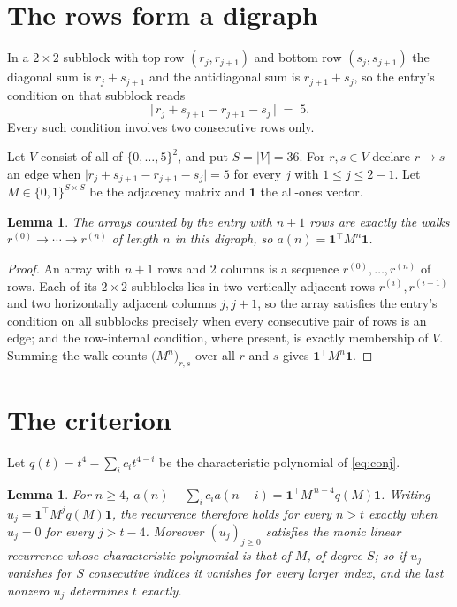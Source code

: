 \documentclass[11pt,a4paper]{article}
\theoremstyle{plain}
\newtheorem{lemma}[theorem]{Lemma}
\theoremstyle{definition}
\begin{document}
\section{The rows form a digraph}

In a $2\times2$ subblock with top row $(r_j,r_{j+1})$ and bottom row $(s_j,s_{j+1})$ the
diagonal sum is $r_j+s_{j+1}$ and the antidiagonal sum is $r_{j+1}+s_j$, so the entry's
condition on that subblock reads
\[
\bigl|\,r_j+s_{j+1}-r_{j+1}-s_j\,\bigr|\;=\;5.
\]
Every such condition involves two consecutive rows only.

Let $V$ consist of all of $\{0,\dots,5\}^{2}$, and put $S=|V|=36$. For $r,s\in V$ declare $r\to s$ an edge
when $\bigl|r_j+s_{j+1}-r_{j+1}-s_j\bigr|=5$ for every $j$ with
$1\le j\le2-1$. Let $M\in\{0,1\}^{S\times S}$ be the adjacency matrix and $\mathbf{1}$
the all-ones vector.

\begin{lemma}\label{lem:walk}
The arrays counted by the entry with $n+1$ rows are exactly the walks
$r^{(0)}\to\cdots\to r^{(n)}$ of length $n$ in this digraph, so
$a(n)=\mathbf{1}^{\!\top}M^{n}\mathbf{1}$.
\end{lemma}

\begin{proof}
An array with $n+1$ rows and $2$ columns is a sequence $r^{(0)},\dots,r^{(n)}$ of
rows. Each of its $2\times2$ subblocks lies in two vertically adjacent rows
$r^{(i)},r^{(i+1)}$ and two horizontally adjacent columns $j,j+1$, so the array satisfies
the entry's condition on all subblocks precisely when every consecutive pair of rows is an
edge; and the row-internal condition, where present, is exactly membership of $V$. Summing
the walk counts $\bigl(M^{n}\bigr)_{r,s}$ over all $r$ and $s$ gives
$\mathbf{1}^{\!\top}M^{n}\mathbf{1}$.
\end{proof}

\section{The criterion}

Let $q(t)=t^{4}-\sum_i c_i t^{4-i}$ be the characteristic polynomial of
\eqref{eq:conj}.

\begin{lemma}\label{lem:crit}
For $n\ge4$,
$a(n)-\sum_i c_i a(n-i)=\mathbf{1}^{\!\top}M^{\,n-4}q(M)\mathbf{1}$. Writing
$u_j=\mathbf{1}^{\!\top}M^{j}q(M)\mathbf{1}$, the recurrence therefore holds for every
$n>t$ exactly when $u_j=0$ for every $j>t-4$. Moreover $(u_j)_{j\ge0}$ satisfies the
monic linear recurrence whose characteristic polynomial is that of $M$, of degree $S$; so
if $u_j$ vanishes for $S$ consecutive indices it vanishes for every larger index, and the
last nonzero $u_j$ determines $t$ exactly.
\end{lemma}
\end{document}
